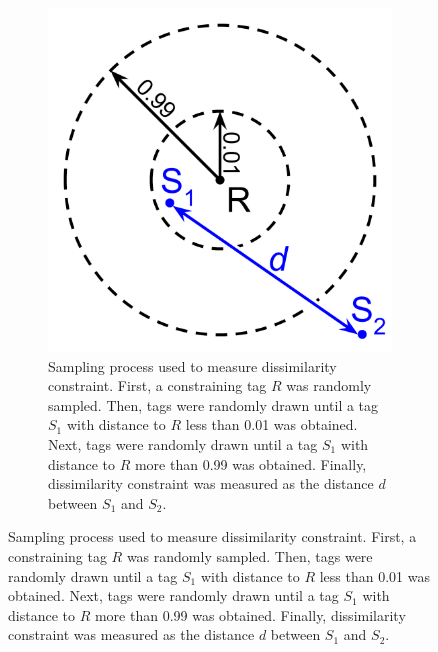 \begin{figure}

\begin{center}
\begin{subfigure}[b]{\linewidth}
\begin{minipage}{0.5\linewidth}

\includegraphics[width=0.75\linewidth]{img/elasticity-statistic}

\end{minipage}
\begin{minipage}{0.5\linewidth}
\caption{
Sampling process used to measure dissimilarity constraint.
First, a constraining tag $R$ was randomly sampled.
Then, tags were randomly drawn until a tag $S_1$ with distance to $R$ less than 0.01 was obtained.
Next, tags were randomly drawn until a tag $S_1$ with distance to $R$ more than 0.99 was obtained.
Finally, dissimilarity constraint was measured as the distance $d$ between $S_1$ and $S_2$.
}
\label{fig:dissimilarity_statistic}
\end{minipage}

\end{subfigure}


\end{center}
\end{figure}
